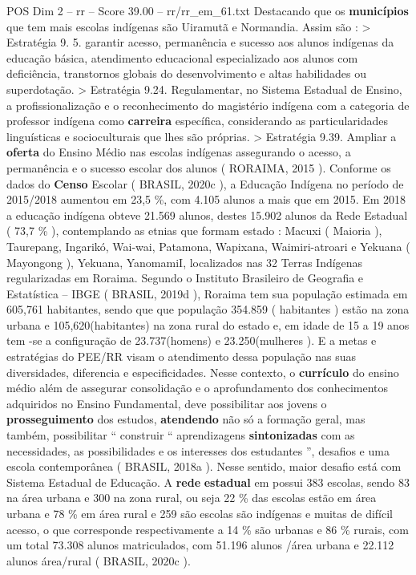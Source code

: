 \begin{textsample}{POS Dim 2 – rr – Score 39.00 – rr/rr\_em\_61.txt}
Destacando que os \textbf{municípios} que tem mais escolas indígenas são Uiramutã e Normandia.
Assim são : > Estratégia 9. 5. garantir acesso, permanência e sucesso aos alunos indígenas da educação básica, atendimento educacional especializado aos alunos com deficiência, transtornos globais do desenvolvimento e altas habilidades ou superdotação. > Estratégia 9.24.
Regulamentar, no Sistema Estadual de Ensino, a profissionalização e o reconhecimento do magistério indígena com a categoria de professor indígena como \textbf{carreira} específica, considerando as particularidades linguísticas e socioculturais que lhes são próprias. > Estratégia 9.39.
Ampliar a \textbf{oferta} do Ensino Médio nas escolas indígenas assegurando o acesso, a permanência e o sucesso escolar dos alunos ( RORAIMA, 2015 ).
Conforme os dados do \textbf{Censo} Escolar ( BRASIL, 2020c ), a Educação Indígena no período de 2015/2018 aumentou em 23,5 \%, com 4.105 alunos a mais que em 2015.
Em 2018 a educação indígena obteve 21.569 alunos, destes 15.902 alunos da Rede Estadual ( 73,7 \% ), contemplando as etnias que formam estado : Macuxi ( Maioria ), Taurepang, Ingarikó, Wai-wai, Patamona, Wapixana, Waimiri-atroari e Yekuana ( Mayongong ), Yekuana, YanomamiI, localizados nas 32 Terras Indígenas regularizadas em Roraima.
Segundo o Instituto Brasileiro de Geografia e Estatística – IBGE ( BRASIL, 2019d ), Roraima tem sua população estimada em 605,761 habitantes, sendo que que população 354.859 ( habitantes ) estão na zona urbana e 105,620(habitantes) na zona rural do estado e, em idade de 15 a 19 anos tem -se a configuração de 23.737(homens) e 23.250(mulheres ).
E a metas e estratégias do PEE/RR visam o atendimento dessa população nas suas diversidades, diferencia e especificidades.
Nesse contexto, o \textbf{currículo} do ensino médio além de assegurar consolidação e o aprofundamento dos conhecimentos adquiridos no Ensino Fundamental, deve possibilitar aos jovens o \textbf{prosseguimento} dos estudos, \textbf{atendendo} não só a formação geral, mas também, possibilitar “ construir “ aprendizagens \textbf{sintonizadas} com as necessidades, as possibilidades e os interesses dos estudantes ”, desafios e uma escola contemporânea ( BRASIL, 2018a ).
Nesse sentido, maior desafio está com Sistema Estadual de Educação.
A \textbf{rede} \textbf{estadual} em possui 383 escolas, sendo 83 na área urbana e 300 na zona rural, ou seja 22 \% das escolas estão em área urbana e 78 \% em área rural e 259 são escolas são indígenas e muitas de difícil acesso, o que corresponde respectivamente a 14 \% são urbanas e 86 \% rurais, com um total 73.308 alunos matriculados, com 51.196 alunos /área urbana e 22.112 alunos área/rural ( BRASIL, 2020c ).

\end{textsample}
